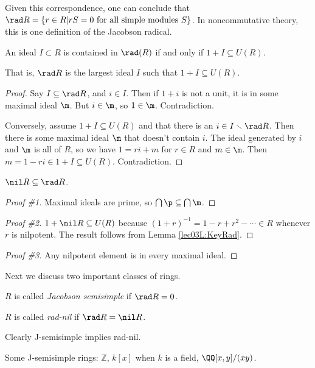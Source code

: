  Given this correspondence, one can conclude that $\rad R = \{r\in R| rS=0 \text{ for all
 simple modules } S\}$. In noncommutative theory, this is one definition of the Jacobson
 radical.

 \begin{lemma}\label{lec03L:KeyRad}
   An ideal $I\subset R$ is contained in $\rad (R)$ if and only if $1+I\subseteq U(R)$.
 \end{lemma}
 That is, $\rad R$ is the largest ideal $I$ such that $1+I\subseteq U(R)$.
 \begin{proof}
   Say $I\subseteq \rad R$, and $i\in I$. Then if $1+i$ is not a unit, it is in some
   maximal ideal $\m$. But $i\in \m$, so $1\in\m$. Contradiction.

   Conversely, assume $1+I\subseteq U(R)$ and that there is an $i\in I\smallsetminus\rad
   R$. Then there is some maximal ideal $\m$ that doesn't contain $i$. The ideal
   generated by $i$ and $\m$ is all of $R$, so we have $1=ri+m$ for $r\in R$ and $m\in
   \m$. Then $m=1-ri\in 1+I\subseteq U(R)$. Contradiction.
 \end{proof}

 \begin{lemma}
   $\nil R\subseteq \rad R$.
 \end{lemma}
 \begin{proof}[Proof \#1]
   Maximal ideals are prime, so $\bigcap \p\subseteq \bigcap \m$.
 \end{proof}
 \begin{proof}[Proof \#2]
   $1+\nil R\subseteq U(R)$ because $(1+r)^{-1}=1-r+r^2-\cdots \in R$ whenever $r$ is
   nilpotent. The result follows from Lemma \ref{lec03L:KeyRad}.
 \end{proof}
 \begin{proof}[Proof \#3]
   Any nilpotent element is in every maximal ideal.
 \end{proof}

 Next we discuss two important classes of rings.
 \begin{definition}
   $R$ is called \emph{Jacobson semisimple} if $\rad R=0$.
 \end{definition}
 \begin{definition}
   $R$ is called \emph{rad-nil} if $\rad R=\nil R$.
 \end{definition}
 Clearly J-semisimple implies rad-nil.
 \begin{example}
   Some J-semisimple rings: $\mathbb{Z}$, $k[x]$ when $k$ is a field, $\QQ[x,y]/(xy)$.
 \end{example}

